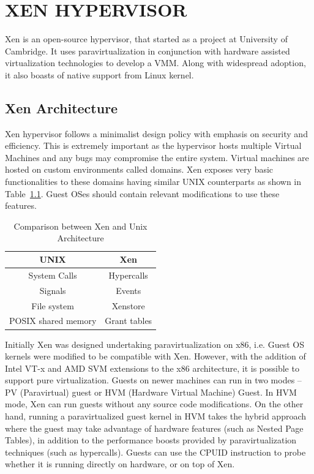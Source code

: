\chapter{\uppercase{Xen Hypervisor}}
Xen is an open-source hypervisor, that started as a project at University of Cambridge. It uses paravirtualization in conjunction with hardware assisted virtualization technologies to develop a VMM. Along with widespread adoption, it also boasts of native support from Linux kernel. 

\section{Xen Architecture}

Xen hypervisor follows a minimalist design policy with emphasis on security and efficiency. This is extremely important as the hypervisor hosts multiple Virtual Machines and any bugs may compromise the entire system. Virtual machines are hosted on custom environments called domains. Xen exposes very basic functionalities to these domains having similar UNIX counterparts as shown in Table~\ref{tab:unixcomp}. Guest OSes should contain relevant modifications to use these features. 

\begin{table}[H]
\centering
\caption[Comparison between Xen and Unix Architecture]{Comparison between Xen and Unix Architecture \cite{chisnall_book}}
\label{tab:unixcomp}
\begin{tabular}{|c|c|}
    \hline
    UNIX & Xen \\
    \hline
    \hline
    System Calls & Hypercalls \\
    \hline
    Signals & Events \\
    \hline
    File system & Xenstore \\
    \hline
    POSIX shared memory & Grant tables  \\
    \hline
\end{tabular}
\end{table}

Initially Xen was designed undertaking paravirtualization on x86, i.e. Guest OS kernels were modified to be compatible with Xen. However, with the addition of Intel VT-x and AMD SVM extensions to the x86 architecture, it is possible to support pure virtualization. Guests on newer machines can run in two modes -- PV (Paravirtual) guest or HVM (Hardware Virtual Machine) Guest. In HVM mode, Xen can run guests without any source code modifications. On the other hand, running a paravirtualized guest kernel in HVM takes the hybrid approach where the guest may take advantage of hardware features (such as Nested Page Tables), in addition to the performance boosts provided by paravirtualization techniques (such as hypercalls). Guests can use the CPUID instruction to probe whether it is running directly on hardware, or on top of Xen.


